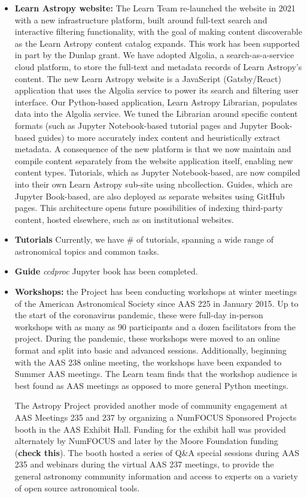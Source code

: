 \documentclass[modern]{aastex631}
\begin{document}
\begin{itemize}

\item {\bf Learn Astropy website:} The Learn Team re-launched the website in
2021 with a new infrastructure platform, built around full-text search and
interactive filtering functionality, with the goal of making content
discoverable as the Learn Astropy content catalog expands.
This work has been supported in part by the Dunlap grant.
We have adopted Algolia, a search-as-a-service cloud platform, to store the
full-text and metadata records of Learn Astropy's content.
The new Learn Astropy website is a JavaScript (Gatsby/React) application that
uses the Algolia service to power its search and filtering user interface.
Our Python-based application, Learn Astropy Librarian, populates data into the
Algolia service. We tuned the Librarian around specific content formats (such as
Jupyter Notebook-based tutorial pages and Jupyter Book-based guides) to more
accurately index content and heuristically extract metadata.
A consequence of the new platform is that we now maintain and compile content
separately from the website application itself, enabling new content types.
Tutorials, which as Jupyter Notebook-based, are now compiled into their own
Learn Astropy sub-site using nbcollection.
Guides, which are Jupyter Book-based, are also deployed as separate websites
using GitHub pages. This architecture opens future possibilities of indexing
third-party content, hosted elsewhere, such as on institutional websites.

\item \textbf{Tutorials} Currently, we have \# of tutorials, spanning a wide range of astronomical topics and common tasks.

\item \textbf{Guide} {\it ccdproc} Jupyter book has been completed.

\item {\bf Workshops:} the Project has been conducting workshops at winter
meetings of the American Astronomical Society since AAS 225 in January 2015.
Up to the start of the coronavirus pandemic, these were full-day in-person
workshops with as many as 90 participants and a dozen facilitators from the
project.
During the pandemic, these workshops were moved to an online format and split
into basic and advanced sessions.
Additionally, beginning with the AAS 238 online meeting, the workshops have been
expanded to Summer AAS meetings.
The Learn team finds that the workshop audience is best found as AAS meetings as
opposed to more general Python meetings.

The Astropy Project provided another mode of community engagement at AAS
Meetings 235 and 237 by organizing a NumFOCUS Sponsored Projects booth in the
AAS Exhibit Hall.
Funding for the exhibit hall was provided alternately by NumFOCUS and later by
the Moore Foundation funding (\textbf{check this}).
The booth hosted a series of Q\&A special sessions during AAS 235 and webinars
during the virtual AAS 237 meetings, to provide the general astronomy community
information and access to experts on a variety of open source astronomical
tools.
\end{itemize}
\end{document}
